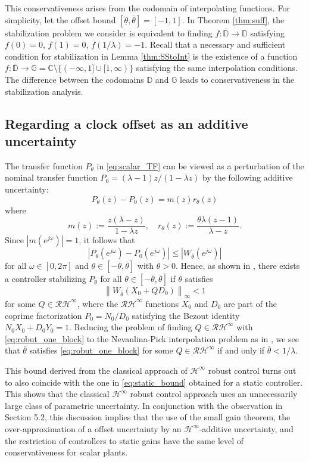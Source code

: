 \documentclass[letterpaper, 12pt, draftcls, onecolumn]{ieeeconf}
\begin{document}
This conservativeness arises from the codomain of
interpolating functions.
For simplicity, let the offset bound 
$[\underline \theta, \overline \theta] = [-1,1]$.
In Theorem \ref{thm:suff},
the stabilization problem we consider is equivalent to
finding $f:\bar{\mathbb{D}} \to \mathbb{D}$ satisfying $f(0)=0$,
$f(1)=0$, $f(1/\lambda)=-1$.
Recall that a necessary and sufficient condition for stabilization in 
Lemma \ref{thm:SStoInt}
is the existence of a function 
$f:\bar{\mathbb{D}} \to \mathbb{G}
=
\mathbb{C} \setminus
\{(-\infty, 1] \cup [1,\infty) \}
$ satisfying the same interpolation
conditions.
The difference between the codomains $\mathbb{D}$ and
$\mathbb{G}$ leads to
conservativeness in the stabilization analysis.


\subsection{Regarding a clock offset as an 
	additive uncertainty}
The transfer function $P_{\theta}$ 
in \eqref{eq:scalar_TF} can be viewed
as a perturbation of the nominal transfer function
$P_0 = (\lambda-1)z/(1-\lambda z)$
by the following additive uncertainty:
\[
P_{\theta}(z) - P_0(z) = m(z)r_{\theta }(z)
\]
where
\[
m(z) :=  \frac{z(\lambda-z)}{1-\lambda z},\quad
r_{\theta }(z) := 
\frac{\theta \lambda(z-1)}{\lambda-z}.
\]
Since 
$|m(e^{j\omega})| = 1$,
it follows that
\[
|P_{\theta}(e^{j\omega}) - P_0(e^{j\omega})| \leq 
|W_{\overline \theta }(e^{j\omega})|
\]
for all $\omega \in [0,2\pi]$ and $\theta \in [-\overline \theta, \overline \theta]$
with $\overline \theta > 0$.
Hence, 
as shown in \cite[Sec. 3.5]{foias1996},
there exists a controller stabilizing $P_{\theta}$
for all $\theta \in [-\overline \theta, \overline \theta]$ 
if $\overline \theta$ satisfies
\begin{equation}
\label{eq:robut_one_block}
\left\|
W_{\overline \theta}(X_0 + Q D_0)
\right\|_{\infty} < 1
\end{equation}
for some $Q \in \mathcal{RH}^{\infty}$,
where the $\mathcal{RH}^{\infty}$ functions
$X_0$ and $D_0$ are part of the coprime factorization 
$P_0 = N_0/D_0$ 
satisfying the Bezout identity $N_0X_0+D_0Y_0 = 1$.
Reducing the problem of finding $Q \in \mathcal{RH}^{\infty}$ with
\eqref{eq:robut_one_block} to the Nevanlina-Pick interpolation problem
as in \cite[Sec. 4.3]{foias1996}, we see that 
$\overline \theta$ satisfies
\eqref{eq:robut_one_block} for some $Q \in \mathcal{RH}^{\infty}$
if and only if
$
\overline \theta <  1/\lambda.
$

This bound derived from the classical approach of $\mathcal{H}^{\infty}$ 
robust control turns out to also coincide with the one
in \eqref{eq:static_bound} obtained for a static controller.
This shows that
the classical $\mathcal{H}^{\infty}$ robust control approach uses
an unnecessarily large class of parametric uncertainty. 
In conjunction with the observation in Section 5.2, 
this discussion implies that
the use of the small gain theorem, the over-approximation of a
offset uncertainty
by an $\mathcal{H}^{\infty}$-additive uncertainty, and
the restriction of controllers to static gains have
the same level of conservativeness for scalar plants.
\end{document}
